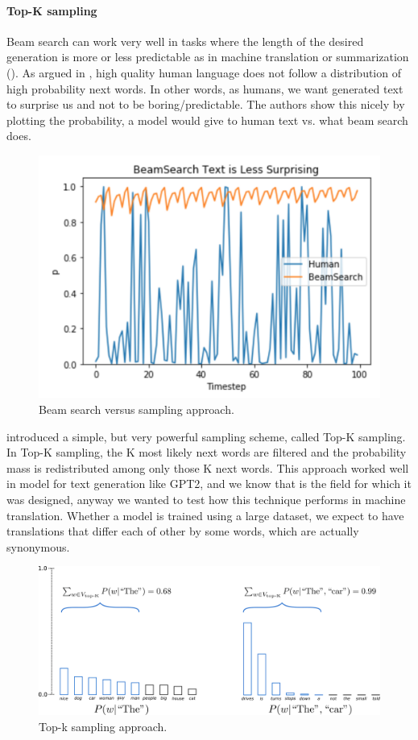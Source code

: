 \paragraph{Top-K sampling}
Beam search can work very well in tasks where the length of the desired generation is more or less predictable as in machine translation or summarization (\cite{yang2018breaking}). As argued in \cite{holtzman2019curious}, high quality human language does not follow a distribution of high probability next words. In other words, as humans, we want generated text to surprise us and not to be boring/predictable. The authors show this nicely by plotting the probability, a model would give to human text vs. what beam search does.

\begin{figure}[H]
    \centering
    \includegraphics[width = .68\linewidth]{images/beam_search_vs_top_k_sampling.png}
    \caption{Beam search versus sampling approach.}
    \label{fig:beam_search_vs_sampling}
\end{figure}

\cite{fan2018hierarchical} introduced a simple, but very powerful sampling scheme, called Top-K sampling. In Top-K sampling, the K most likely next words are filtered and the probability mass is redistributed among only those K next words. This approach worked well in model for text generation like GPT2, and we know that is the field for which it was designed, anyway we wanted to test how this technique performs in machine translation. Whether a model is trained using a large dataset, we expect to have translations that differ each of other by some words, which are actually synonymous.

\begin{figure}[H]
    \centering
    \includegraphics[width = .89\linewidth]{images/top_k_sampling.png}
    \caption{Top-k sampling approach.}
    \label{fig:topk_sampling}
\end{figure}

